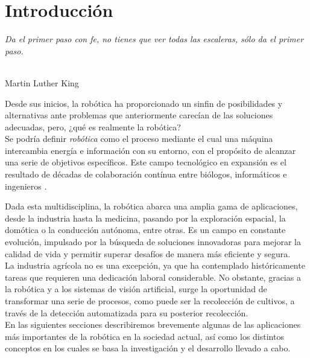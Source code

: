 \chapter{Introducción}
\label{cap:capitulo1}
\setcounter{page}{1}

\begin{flushright}
\begin{minipage}[]{10cm}
\emph{Da el primer paso con fe, no tienes que ver todas las escaleras, sólo da el primer paso.}\\
\end{minipage}\\

Martin Luther King\\
\end{flushright}

\vspace{1cm}

Desde sus inicios, la robótica ha proporcionado un sinfin de posibilidades y alternativas ante problemas que anteriormente carecían de las soluciones adecuadas, pero, ¿qué es realmente la robótica?\\

Se podría definir \textit{robótica} como el proceso mediante el cual una máquina intercambia energía e información con su entorno, con el propósito de alcanzar una serie de objetivos específicos. Este campo tecnológico en expansión es el resultado de décadas de colaboración contínua entre biólogos, informáticos e ingenieros \cite{Koditschek21}.

Dada esta multidisciplina, la robótica abarca una amplia gama de aplicaciones, desde la industria hasta la medicina, pasando por la exploración espacial, la domótica o la conducción autónoma, entre otras. Es un campo en constante evolución, impulsado por la búsqueda de soluciones innovadoras para mejorar la calidad de vida y permitir superar desafíos de manera más eficiente y segura.\\

La industria agrícola no es una excepción, ya que ha contemplado históricamente tareas que requieren una dedicación laboral considerable. No obstante, gracias a la robótica y a los sistemas de visión artificial, surge la oportunidad de transformar una serie de procesos, como puede ser la recolección de cultivos, a través de la detección automatizada para su posterior recolección.\\

En las siguientes secciones describiremos brevemente algunas de las aplicaciones más importantes de la robótica en la sociedad actual, así como los distintos conceptos en los cuales se basa la investigación y el desarrollo llevado a cabo.\\


